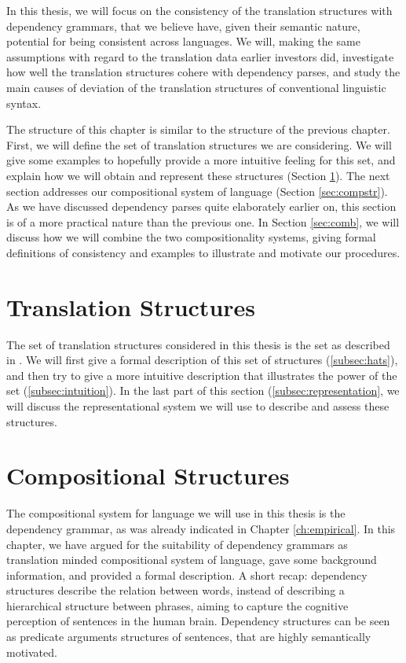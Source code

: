 \documentclass{report}
\begin{document}
In this thesis, we will focus on the consistency of the translation structures with dependency grammars, that we believe have, given their semantic nature, potential for being consistent across languages. We will, making the same assumptions with regard to the translation data earlier investors did, investigate how well the translation structures cohere with dependency parses, and study the main causes of deviation of the translation structures of conventional linguistic syntax.

The structure of this chapter is similar to the structure of the previous chapter. First, we will define the set of translation structures we are considering. We will give some examples to hopefully provide a more intuitive feeling for this set, and explain how we will obtain and represent these structures (Section \ref{sec:transstr}). The next section addresses our compositional system of language (Section \ref{sec:compstr}). As we have discussed dependency parses quite elaborately earlier on, this section is of a more practical nature than the previous one. In Section \ref{sec:comb}, we will discuss how we will combine the two compositionality systems, giving formal definitions of consistency and examples to illustrate and motivate our procedures.


\section{Translation Structures}
\label{sec:transstr}

The set of translation structures considered in this thesis is the set as described in \cite{simaan2013hats}. We will first give a formal description of this set of structures (\ref{subsec:hats}), and then try to give a more intuitive description that illustrates the power of the set (\ref{subsec:intuition}). In the last part of this section (\ref{subsec:representation}, we will discuss the representational system we will use to describe and assess these structures.


\section{Compositional Structures}

The compositional system for language we will use in this thesis is the dependency grammar, as was already indicated in Chapter \ref{ch:empirical}. In this chapter, we have argued for the suitability of dependency grammars as translation minded compositional system of language, gave some background information, and provided a formal description. A short recap: dependency structures describe the relation between words, instead of describing a hierarchical structure between phrases, aiming to capture the cognitive perception of sentences in the human brain. Dependency structures can be seen as predicate arguments structures of sentences, that are highly semantically motivated.
\end{document}
